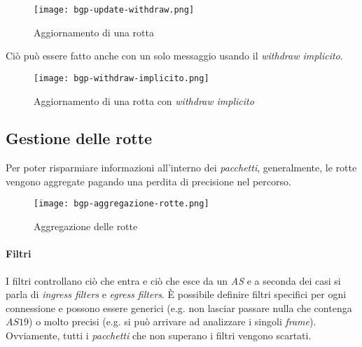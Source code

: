 \begin{figure}[ht]
    \centering
    \texttt{[image: bgp-update-withdraw.png]}
    \caption{Aggiornamento di una rotta}
\end{figure}

\noindent
Ciò può essere fatto anche con un solo messaggio usando il \emph{withdraw implicito}.
\begin{figure}[h!]
    \centering
    \texttt{[image: bgp-withdraw-implicito.png]}
    \caption{Aggiornamento di una rotta con \emph{withdraw implicito}}
\end{figure}

\subsection{Gestione delle rotte}
Per poter risparmiare informazioni all’interno dei \emph{pacchetti}, generalmente,
le rotte vengono aggregate pagando una perdita di precisione nel percorso.

\begin{figure}[h!]
    \centering
    \texttt{[image: bgp-aggregazione-rotte.png]}
    \caption{Aggregazione delle rotte}
\end{figure}

\paragraph{Filtri}
I filtri controllano ciò che entra e ciò che esce da un \emph{AS} e a seconda dei
casi si parla di \emph{ingress filters} e \emph{egress filters}. È possibile
definire filtri specifici per ogni connessione e possono essere generici
(e.g. non lasciar passare nulla che contenga $AS19$) o molto precisi (e.g. si
può arrivare ad analizzare i singoli \emph{frame}). Ovviamente, tutti i
\emph{pacchetti} che non superano i filtri vengono scartati.

